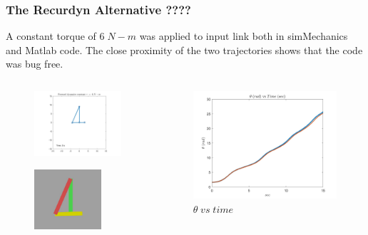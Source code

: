 \documentclass[10pt,aspectratio=169]{beamer}
\begin{document}
\begin{frame}
\frametitle{The Recurdyn Alternative ????}
{\scriptsize  A constant torque of $6 \;N-m$ was applied to input link both in simMechanics and Matlab code. The close proximity of the two trajectories shows that the code was bug free.}
\begin{columns}
	\begin{column}{5cm}
		\begin{figure}
			\centering
			\href{run:./figure/theValidationVideo.avi}{\includegraphics[width=3.7cm,keepaspectratio]{theValidationBanner}}
		\end{figure}
		\begin{figure}
			\centering
			\href{run:./figure/fourbarSimMechanics.avi}{\includegraphics[width=2.5cm,keepaspectratio]{fourbarSimMechanicsBanner}}
		\end{figure}
	\end{column}
	\begin{column}{6cm}
		\begin{figure}
			\centering
			\includegraphics[width=6cm,keepaspectratio]{theValidation}
			\caption{$\theta \; vs \; time$}
		\end{figure}
	\end{column}
	

\end{columns}
\end{frame}
\end{document}
